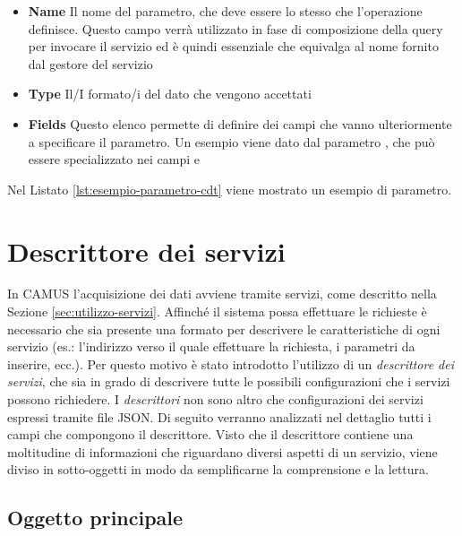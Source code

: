 \begin{itemize}
	\item \textbf{Name} Il nome del parametro, che deve essere lo stesso che l'operazione definisce. Questo campo verrà utilizzato in fase di composizione della query per invocare il servizio ed è quindi essenziale che equivalga al nome fornito dal gestore del servizio
	\item \textbf{Type} Il/I formato/i del dato che vengono accettati
	\item \textbf{Fields} Questo elenco permette di definire dei campi che vanno ulteriormente a specificare il parametro. Un esempio viene dato dal parametro , che può essere specializzato nei campi  e 
\end{itemize}

Nel Listato \ref{lst:esempio-parametro-cdt} viene mostrato un esempio di parametro.



\section{Descrittore dei servizi\label{sec:descrittore-servizi}}

In CAMUS l'acquisizione dei dati avviene tramite servizi, come descritto nella Sezione \ref{sec:utilizzo-servizi}. Affinché il sistema possa effettuare le richieste è necessario che sia presente una formato per descrivere le caratteristiche di ogni servizio (es.: l'indirizzo verso il quale effettuare la richiesta, i parametri da inserire, ecc.). Per questo motivo è stato introdotto l'utilizzo di un \emph{descrittore dei servizi}, che sia in grado di descrivere tutte le possibili configurazioni che i servizi possono richiedere. I \emph{descrittori} non sono altro che configurazioni dei servizi espressi tramite file JSON. Di seguito verranno analizzati nel dettaglio tutti i campi che compongono il descrittore. Visto che il descrittore contiene una moltitudine di informazioni che riguardano diversi aspetti di un servizio, viene diviso in sotto-oggetti in modo da semplificarne la comprensione e la lettura.

\subsection{Oggetto principale\label{sec:oggetto-principale-servizi}}

